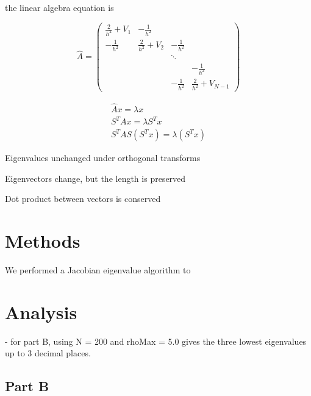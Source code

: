 \documentclass{article}
\begin{document}
the linear algebra equation is

\begin{equation}
\hat{A} = 
\left( \begin{array}{cccc}
	 \frac{2}{h^2} + V_1 &    -\frac{1}{h^2}   &                &                        \\
	-\frac{1}{h^2}       & \frac{2}{h^2} + V_2 & -\frac{1}{h^2} &                        \\
	                     &                     &     \ddots     &                        \\
	                     &                     &                &    -\frac{1}{h^2}      \\
	                     &                     & -\frac{1}{h^2} & \frac{2}{h^2} + V_{N-1}
   \end{array} \right)
\end{equation}

\begin{eqnarray}
\hat{A} x = \lambda x \\
S^T A x = \lambda S^T x \\
S^T A S (S^T x) = \lambda (S^T x)
\end{eqnarray}

Eigenvalues unchanged under orthogonal transforms

Eigenvectors change, but the length is preserved

Dot product between vectors is conserved

\section{Methods}

We performed a Jacobian eigenvalue algorithm to 

\section{Analysis}

- for part B, using N = 200 and rhoMax = 5.0 gives the three lowest eigenvalues up to 3 decimal places.

\subsection{Part B}
\end{document}

